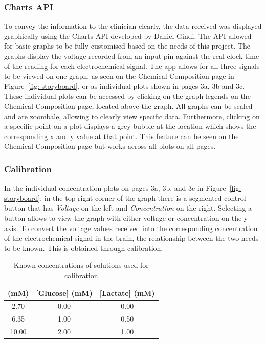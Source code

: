 \subsubsection{Charts API}
To convey the information to the clinician clearly, the data received was displayed graphically using the Charts API developed by Daniel Gindi. The API allowed for basic graphs to be fully customised based on the needs of this project. The graphs display the voltage recorded from an input pin against the real clock time of the reading for each electrochemical signal. The app allows for all three signals to be viewed on one graph, as seen on the Chemical Composition page in Figure~\ref{fig: storyboard}, or as individual plots shown in pages 3a, 3b and 3c. These individual plots can be accessed by clicking on the graph legends on the Chemical Composition page, located above the graph. All graphs can be scaled and are zoombale, allowing to clearly view specific data. Furthermore, clicking on a specific point on a plot displays a grey bubble at the location which shows the corresponding x and y value at that point. This feature can be seen on the Chemical Composition page but works across all plots on all pages.


\subsubsection{Calibration}
In the individual concentration plots on pages 3a, 3b, and 3c in Figure~\ref{fig: storyboard}, in the top right corner of the graph there is a segmented control button that has \textit{Voltage} on the left and \textit{Concentration} on the right. Selecting a button allows to view the graph with either voltage or concentration on the y-axis. To convert the voltage values received into the corresponding concentration of the electrochemical signal in the brain, the relationship between the two needs to be known. This is obtained through calibration. 

\begin{table}[h!]
\centering
\begin{tabular}{||c c c||} 
 \hline
 [K+] (mM) & [Glucose] (mM) & [Lactate] (mM) \\ [0.5ex] 
 \hline\hline
 2.70 & 0.00 & 0.00 \\
 6.35 & 1.00 & 0.50 \\
 10.00 & 2.00 & 1.00 \\
 \hline
\end{tabular}
\caption{Known concentrations of solutions used for calibration}
\label{table: calibration conc}
\end{table}

